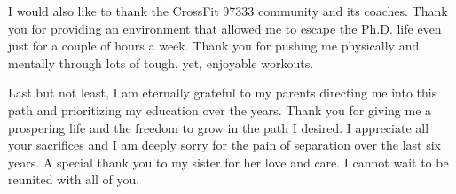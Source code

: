 I would also like to thank  the CrossFit 97333 community
and its coaches. 
Thank you for providing an environment that 
allowed me to escape the Ph.D. life even just for a couple of hours a week. Thank you
for pushing me physically and mentally through lots of tough, yet, enjoyable workouts. 
%
%

Last but not least, I am eternally grateful 
to my parents directing me into this path and prioritizing my education over the years. 
Thank you for giving me a prospering life and the freedom to grow in the path I desired.
I appreciate all your sacrifices and I am deeply sorry for the pain of separation over the last six 
years. A special thank you to my sister for her love and care. I cannot wait to be reunited with all of you.


